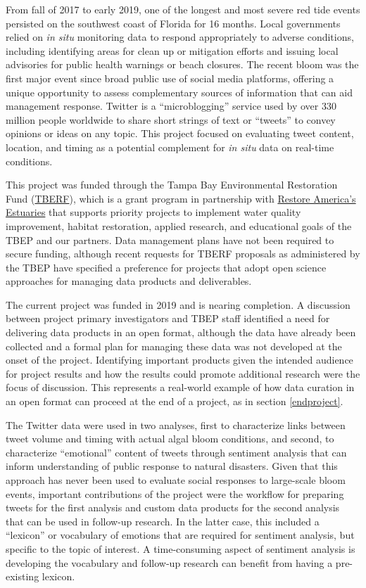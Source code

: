 \documentclass[
]{book}
\begin{document}
From fall of 2017 to early 2019, one of the longest and most severe red tide events persisted on the southwest coast of Florida for 16 months. Local governments relied on \emph{in situ} monitoring data to respond appropriately to adverse conditions, including identifying areas for clean up or mitigation efforts and issuing local advisories for public health warnings or beach closures. The recent bloom was the first major event since broad public use of social media platforms, offering a unique opportunity to assess complementary sources of information that can aid management response. Twitter is a ``microblogging'' service used by over 330 million people worldwide to share short strings of text or ``tweets'' to convey opinions or ideas on any topic. This project focused on evaluating tweet content, location, and timing as a potential complement for \emph{in situ} data on real-time conditions.

This project was funded through the Tampa Bay Environmental Restoration Fund (\href{https://tbep.org/our-work/restoration-research/tberf/}{TBERF}), which is a grant program in partnership with \href{https://estuaries.org/}{Restore America's Estuaries} that supports priority projects to implement water quality improvement, habitat restoration, applied research, and educational goals of the TBEP and our partners. Data management plans have not been required to secure funding, although recent requests for TBERF proposals as administered by the TBEP have specified a preference for projects that adopt open science approaches for managing data products and deliverables.

The current project was funded in 2019 and is nearing completion. A discussion between project primary investigators and TBEP staff identified a need for delivering data products in an open format, although the data have already been collected and a formal plan for managing these data was not developed at the onset of the project. Identifying important products given the intended audience for project results and how the results could promote additional research were the focus of discussion. This represents a real-world example of how data curation in an open format can proceed at the end of a project, as in section \ref{endproject}.

The Twitter data were used in two analyses, first to characterize links between tweet volume and timing with actual algal bloom conditions, and second, to characterize ``emotional'' content of tweets through sentiment analysis that can inform understanding of public response to natural disasters. Given that this approach has never been used to evaluate social responses to large-scale bloom events, important contributions of the project were the workflow for preparing tweets for the first analysis and custom data products for the second analysis that can be used in follow-up research. In the latter case, this included a ``lexicon'' or vocabulary of emotions that are required for sentiment analysis, but specific to the topic of interest. A time-consuming aspect of sentiment analysis is developing the vocabulary and follow-up research can benefit from having a pre-existing lexicon.
\end{document}
